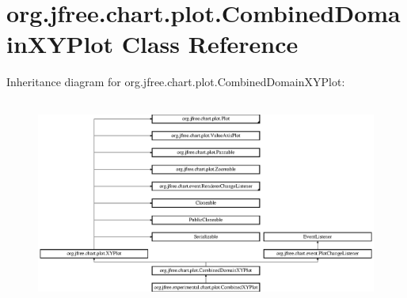 \hypertarget{classorg_1_1jfree_1_1chart_1_1plot_1_1_combined_domain_x_y_plot}{}\section{org.\+jfree.\+chart.\+plot.\+Combined\+Domain\+X\+Y\+Plot Class Reference}
\label{classorg_1_1jfree_1_1chart_1_1plot_1_1_combined_domain_x_y_plot}
Inheritance diagram for org.\+jfree.\+chart.\+plot.\+Combined\+Domain\+X\+Y\+Plot\+:\begin{figure}[H]
\begin{center}
\leavevmode
\includegraphics[height=6.844445cm]{classorg_1_1jfree_1_1chart_1_1plot_1_1_combined_domain_x_y_plot}
\end{center}
\end{figure}
